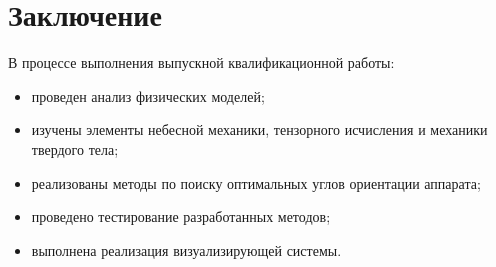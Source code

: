 \chapter{Заключение}
\noindent\indent В процессе выполнения выпускной квалификационной работы:
\begin{itemize}
    \item проведен анализ физических моделей;
    \item изучены элементы небесной механики, тензорного исчисления и механики
    твердого тела;
    \item реализованы методы по поиску оптимальных углов ориентации аппарата;
    \item проведено тестирование разработанных методов;
    \item выполнена реализация визуализирующей системы.
\end{itemize}
